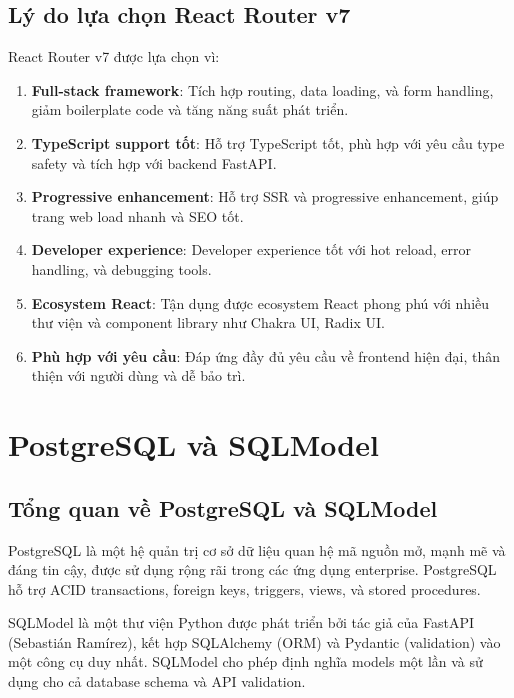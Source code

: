 \documentclass[../DoAn.tex]{subfiles}
\begin{document}
\subsection{Lý do lựa chọn React Router v7}

React Router v7 được lựa chọn vì:

\begin{enumerate}
    \item \textbf{Full-stack framework}: Tích hợp routing, data loading, và form handling, giảm boilerplate code và tăng năng suất phát triển.
    
    \item \textbf{TypeScript support tốt}: Hỗ trợ TypeScript tốt, phù hợp với yêu cầu type safety và tích hợp với backend FastAPI.
    
    \item \textbf{Progressive enhancement}: Hỗ trợ SSR và progressive enhancement, giúp trang web load nhanh và SEO tốt.
    
    \item \textbf{Developer experience}: Developer experience tốt với hot reload, error handling, và debugging tools.
    
    \item \textbf{Ecosystem React}: Tận dụng được ecosystem React phong phú với nhiều thư viện và component library như Chakra UI, Radix UI.
    
    \item \textbf{Phù hợp với yêu cầu}: Đáp ứng đầy đủ yêu cầu về frontend hiện đại, thân thiện với người dùng và dễ bảo trì.
\end{enumerate}

\section{PostgreSQL và SQLModel}
\label{section:3.4}

\subsection{Tổng quan về PostgreSQL và SQLModel}

PostgreSQL là một hệ quản trị cơ sở dữ liệu quan hệ mã nguồn mở, mạnh mẽ và đáng tin cậy, được sử dụng rộng rãi trong các ứng dụng enterprise. PostgreSQL hỗ trợ ACID transactions, foreign keys, triggers, views, và stored procedures.

SQLModel là một thư viện Python được phát triển bởi tác giả của FastAPI (Sebastián Ramírez), kết hợp SQLAlchemy (ORM) và Pydantic (validation) vào một công cụ duy nhất. SQLModel cho phép định nghĩa models một lần và sử dụng cho cả database schema và API validation.
\end{document}

